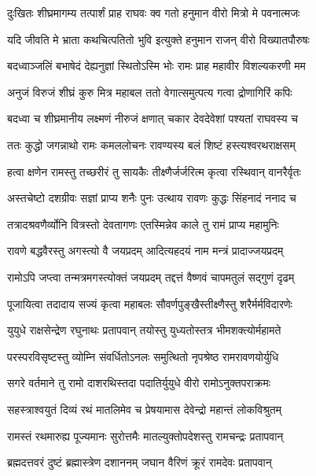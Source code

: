 \twolineshloka
{दुःखितः शीघ्रमागम्य तत्पार्शं प्राह राघवः}
{क्व गतो हनुमान वीरो मित्रो मे पवनात्मजः} %

\twolineshloka
{यदि जीवति मे भ्राता कथचित्पतितो भुवि}
{इत्युक्ते हनुमान राजन् वीरो विख्यातपौरुषः} %

\twolineshloka
{बदध्वाञ्जलिं बभाषेदं देह्यनुज्ञां स्थितोऽस्मि भोः}
{रामः प्राह महावीर विशल्यकरणी मम} %

\twolineshloka
{अनुजं विरुजं शीघ्रं कुरु मित्र महाबल}
{ततो वेगात्समुत्पत्य गत्वा द्रोणागिरिं कपिः} %

\twolineshloka
{बदध्वा च शीघ्रमानीय लक्ष्मणं नीरुजं क्षणात्}
{चकार देवदेवेशां पश्यतां राघवस्य च} %

\twolineshloka
{ततः कुद्धो जगन्नाथो रामः कमललोचनः}
{रावण्यस्य बलं शिष्टं हस्त्यश्वरथराक्षसम्} %

\twolineshloka
{हत्वा क्षणेन रामस्तु तच्छरीरं तु सायकैः}
{तीक्ष्णैर्जर्जरित्म कृत्वा रस्थिवान् वानरैर्वृतः} %

\twolineshloka
{अस्तचेष्टो दशग्रीवः सज्ञां प्राप्य शनैः पुनः}
{उत्थाय रावणः कुद्धः सिंहनादं ननाद च} %

\twolineshloka
{तत्रादश्रवणैर्व्योनि वित्रस्तो देवतागणः}
{एतस्मिन्नेव काले तु रामं प्राप्य महामुनिः} %

\twolineshloka
{रावणे बद्धवैरस्तु अगस्त्यो वै जयप्रदम्}
{आदित्यहदयं नाम मन्त्रं प्रादाज्जयप्रदम्} %

\twolineshloka
{रामोऽपि जप्त्वा तन्मत्रमगस्त्योक्तं जयप्रदम्}
{तद्दत्तं वैष्णवं चापमतुलं सद्गुणं दृढम्} %

\twolineshloka
{पूजायित्वा तदादाय सज्यं कृत्वा महाबलः}
{सौवर्णपुङ्खैस्तीक्ष्णैस्तु शरैर्मर्मविदारणेः} %

\twolineshloka
{युयुधे राक्षसेन्द्रेण रघुनाथः प्रतापवान्}
{तयोस्तु युध्यतोस्तत्र भीमशक्त्योर्महामते} %

\twolineshloka
{परस्परविसृष्टस्तु व्योम्नि संवर्धितोऽनलः}
{समुत्थितो नृपश्रेष्ठ रामरावणयोर्युधि} %

\twolineshloka
{सगरे वर्तमाने तु रामो दाशरथिस्तदा}
{पदातिर्युयुधे वीरो रामोऽनुक्तपराक्रमः} %

\twolineshloka
{सहस्त्राश्वयुतं दिव्यं रथं मातलिमेव च}
{प्रेषयामास देवेन्द्रो महान्तं लोकविश्रुतम्} %

\twolineshloka
{रामस्तं रथमारुह्य पूज्यमानः सुरोत्तमैः}
{मातल्युक्तोपदेशस्तु रामचन्द्रः प्रतापवान्} %

\twolineshloka
{ब्रह्मदत्तवरं दुष्टं ब्रह्मास्त्रेण दशाननम्}
{जघान वैरिणं क्रूरं रामदेवः प्रतापवान्} %


